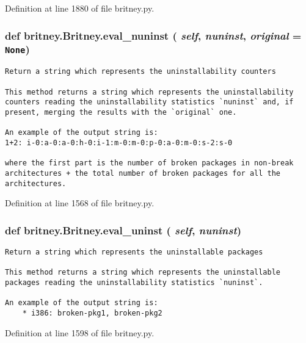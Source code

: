 Definition at line 1880 of file britney.py.
\subsubsection{\setlength{\rightskip}{0pt plus 5cm}def britney.Britney.eval\_\-nuninst ( {\em self},  {\em nuninst},  {\em original} = {\tt None})}\label{classbritney_1_1Britney_e5c18b706e6598474435b1996313cf27}




\footnotesize\begin{verbatim}Return a string which represents the uninstallability counters

This method returns a string which represents the uninstallability
counters reading the uninstallability statistics `nuninst` and, if
present, merging the results with the `original` one.

An example of the output string is:
1+2: i-0:a-0:a-0:h-0:i-1:m-0:m-0:p-0:a-0:m-0:s-2:s-0

where the first part is the number of broken packages in non-break
architectures + the total number of broken packages for all the
architectures.
\end{verbatim}
\normalsize
 

Definition at line 1568 of file britney.py.
\subsubsection{\setlength{\rightskip}{0pt plus 5cm}def britney.Britney.eval\_\-uninst ( {\em self},  {\em nuninst})}\label{classbritney_1_1Britney_b8dd18ead23b6e1126bb4c2a5c3cd8ba}




\footnotesize\begin{verbatim}Return a string which represents the uninstallable packages

This method returns a string which represents the uninstallable
packages reading the uninstallability statistics `nuninst`.

An example of the output string is:
    * i386: broken-pkg1, broken-pkg2
\end{verbatim}
\normalsize
 

Definition at line 1598 of file britney.py.
